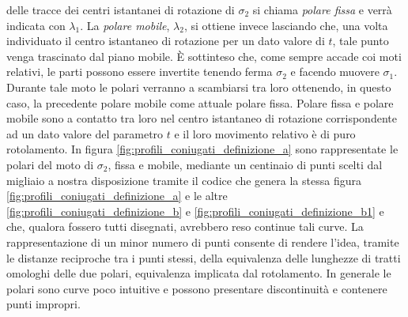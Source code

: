 delle tracce dei centri istantanei di rotazione di $\sigma_2$
si chiama {\em polare fissa} e verr\`a indicata con $\lambda_1$.
La {\em polare mobile}, $\lambda_2$,
si ottiene invece lasciando che, una volta individuato il
centro istantaneo di rotazione per un dato valore di
$t$, tale punto venga trascinato
dal piano mobile. \`E sottinteso che, come sempre accade coi moti relativi,
le parti possono essere 
invertite tenendo ferma $\sigma_2$ e facendo muovere $\sigma_1$. Durante tale moto
le polari verranno a scambiarsi tra loro ottenendo, in questo caso, la 
precedente polare mobile come attuale polare fissa.
Polare fissa e polare mobile sono a contatto
tra loro nel centro istantaneo di rotazione corrispondente ad un 
dato valore del parametro $t$ e il loro movimento relativo \`e di puro rotolamento.
In figura \ref{fig:profili_coniugati_definizione_a} sono rappresentate
le polari del moto di $\sigma_2$, fissa e mobile, mediante un centinaio
di punti scelti dal migliaio a nostra disposizione tramite
il codice che genera la stessa figura
\ref{fig:profili_coniugati_definizione_a} e le altre
\ref{fig:profili_coniugati_definizione_b} e
\ref{fig:profili_coniugati_definizione_b1} e che,
qualora fossero tutti disegnati, avrebbero reso continue tali curve.
La rappresentazione
di un minor numero di punti consente di rendere l'idea,
tramite le distanze reciproche tra i punti stessi,
della equivalenza delle lunghezze di tratti
omologhi delle due polari, equivalenza implicata dal rotolamento.
In generale le polari sono curve poco intuitive e possono presentare
discontinuit\`a e contenere punti impropri.

